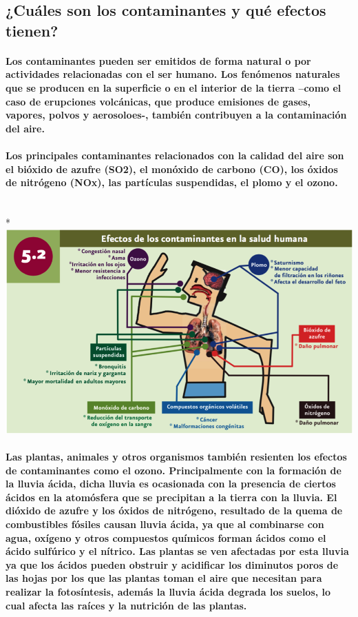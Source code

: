 \subsection {¿Cuáles son los contaminantes y qué efectos tienen?}
\paragraph {Los contaminantes pueden ser emitidos de forma natural o por actividades relacionadas con el ser humano. Los fenómenos naturales que se producen en la superficie o  en el interior de la tierra –como el caso de erupciones volcánicas, que produce emisiones de gases, vapores, polvos y aerosoloes-, también contribuyen a la contaminación del aire.}
\paragraph {Los principales contaminantes relacionados con la calidad del aire son el bióxido de azufre (SO2), el monóxido de carbono (CO), los óxidos  de nitrógeno (NOx), las partículas suspendidas, el plomo y el ozono.}
~\\*
\includegraphics[]{./images/1.png}
\paragraph {Las plantas, animales y otros organismos también resienten los efectos de contaminantes como el ozono. Principalmente con la formación de la lluvia ácida, dicha lluvia es ocasionada con la presencia de ciertos ácidos en la atomósfera que se precipitan a la tierra con la lluvia. El dióxido de azufre y los óxidos de nitrógeno, resultado de la quema de combustibles  fósiles causan lluvia ácida, ya que al combinarse con agua, oxígeno y otros compuestos químicos forman ácidos como el ácido sulfúrico y el nítrico. Las plantas se ven afectadas por esta lluvia ya que los ácidos pueden obstruir y acidificar los diminutos poros de las hojas por los que las plantas toman el aire que necesitan para realizar la fotosíntesis, además la lluvia ácida degrada los suelos, lo cual afecta las raíces y la nutrición de las plantas.}
